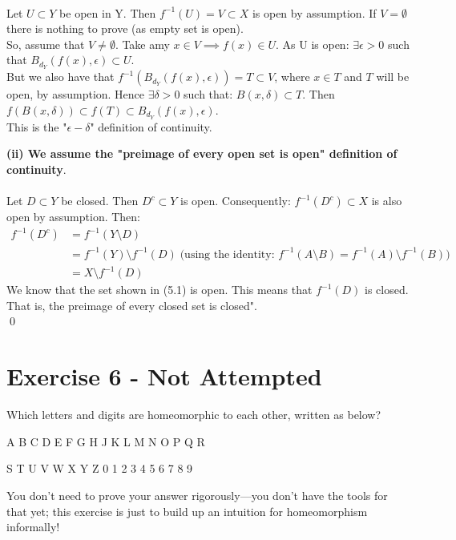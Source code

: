 \documentclass[12pt]{article}
\begin{document}
\\
Let $U \subset Y$ be open in Y.  Then $f^{-1}(U) = V \subset X$ is open by assumption.  If $V = \emptyset$ there is nothing to prove (as empty set is open).\\
So, assume that $V \ne \emptyset$.  Take amy $x \in V \implies f(x) \in U$.  As U is open: $\exists \epsilon > 0$ such that $B_{d_Y}(f(x), \epsilon) \subset U$.\\
But we also have that $f^{-1}(B_{d_Y}(f(x), \epsilon)) = T \subset V$, where $x \in T$ and $T$ will be open, by assumption.  Hence $\exists \delta > 0$ such that:
$B(x, \delta) \subset T$. Then $f(B(x, \delta)) \subset f(T) \subset B_{d_Y}(f(x), \epsilon)$.\\
This is the "$\epsilon - \delta$" definition of continuity.

\newpage
\noindent
\textbf{(ii) We assume the "preimage of every open set is open" definition of continuity}.\\
\\
Let $D \subset Y$ be closed.  Then $D^c \subset Y$ is open.  Consequently: $f^{-1}(D^c) \subset X$ is also open by assumption.  Then:
\begin{align*}
  f^{-1}(D^c) &= f^{-1}(Y \setminus D) \\
  &= f^{-1}(Y) \setminus f^{-1}(D) \; \text{(using the identity: $f^{-1}(A \setminus B) = f^{-1}(A) \setminus f^{-1}(B)$)} \\
  &= X \setminus f^{-1}(D) \tag{5.1}
\end{align*}
We know that the set shown in (5.1) is open.  This means that $f^{-1}(D)$ is closed.\\
That is, the preimage of every closed set is closed".\\
\qed

\newpage

\section*{Exercise 6 - Not Attempted}

\noindent

Which letters and digits are homeomorphic to each other, written as below?

\vspace{0.5cm}

\begin{center}
A B C D E F G H J K L M N O P Q R

\vspace{0.2cm}

S T U V W X Y Z 0 1 2 3 4 5 6 7 8 9
\end{center}

\vspace{0.5cm}

\noindent

You don't need to prove your answer rigorously---you don't have the tools for that yet; this exercise is just to build up an intuition for homeomorphism informally!
\end{document}
